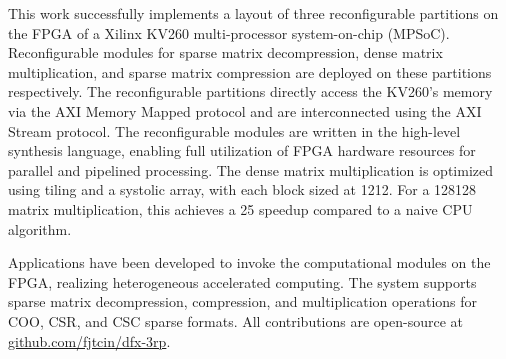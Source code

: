 

\begin{abstract}
本工作在Xilinx KV260多处理器系统芯片的FPGA上，成功实现了3个可重构分区的布局，并在上面分别部署了稀疏矩阵解压、稠密矩阵乘法、稀疏矩阵压缩的可重构模块。
可重构分区通过AXIMM协议对KV260的内存直接访问，同时通过AXIS协议进行互联。
可重构模块使用高层次综合语言编写，能充分利用FPGA的硬件资源，实现并行、流水线地处理。
稠密矩阵乘法使用分块与脉动阵列优化，每个块大小12\texttimes{}12，对于128\texttimes{}128矩阵乘法相较CPU朴素算法实现了25\texttimes{}的加速比。

在KV260的CPU上，编写程序调用FPGA上的计算模块，实现了异构加速计算。
支持COO, CSR和CSC三种稀疏格式的稀疏矩阵解压/压缩/乘法操作。所有贡献开源于\url{github.com/fjtcin/dfx-3rp}。
\end{abstract}

\begin{abstract*}
This work successfully implements a layout of three reconfigurable partitions on the FPGA of a Xilinx KV260 multi-processor system-on-chip (MPSoC).
Reconfigurable modules for sparse matrix decompression, dense matrix multiplication, and sparse matrix compression are deployed on these partitions respectively.
The reconfigurable partitions directly access the KV260's memory via the AXI Memory Mapped protocol and are interconnected using the AXI Stream protocol.
The reconfigurable modules are written in the high-level synthesis language,
enabling full utilization of FPGA hardware resources for parallel and pipelined processing.
The dense matrix multiplication is optimized using tiling and a systolic array, with each block sized at 12\texttimes{}12.
For a 128\texttimes{}128 matrix multiplication, this achieves a 25\texttimes{} speedup compared to a naive CPU algorithm.

Applications have been developed to invoke the computational modules on the FPGA,
realizing heterogeneous accelerated computing. The system supports sparse matrix decompression,
compression, and multiplication operations for COO, CSR, and CSC sparse formats. All contributions are open-source at \url{github.com/fjtcin/dfx-3rp}.
\end{abstract*}
